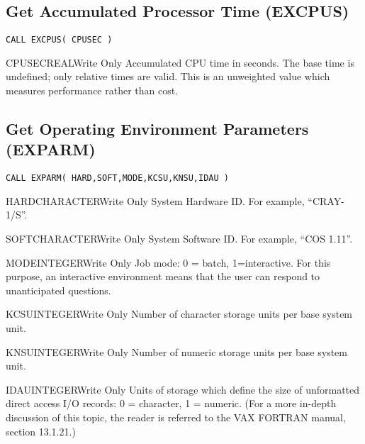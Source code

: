 \subsection{Get Accumulated Processor Time (EXCPUS)}

\verb+CALL EXCPUS( CPUSEC )+

\begin{argy}{CPUSEC}{REAL}{Write Only}
Accumulated CPU time in seconds.  The base time is undefined; only relative
times are valid.  This is an unweighted value which measures performance
rather than cost. 
\end{argy}

\subsection{Get Operating Environment Parameters (EXPARM)}

\verb+CALL EXPARM( HARD,SOFT,MODE,KCSU,KNSU,IDAU )+

\begin{argy}{HARD}{CHARACTER}{Write Only}
System Hardware ID.  For example, ``CRAY-1/S''.
\end{argy}

\begin{argy}{SOFT}{CHARACTER}{Write Only}
System Software ID.  For example, ``COS 1.11''.
\end{argy}

\begin{argy}{MODE}{INTEGER}{Write Only}
Job mode: 0 = batch, 1=interactive.  For this purpose, an interactive
environment means that the user can respond to unanticipated questions. 
\end{argy}

\begin{argy}{KCSU}{INTEGER}{Write Only}
Number of character storage units per base system unit.
\end{argy}

\begin{argy}{KNSU}{INTEGER}{Write Only}
Number of numeric storage units per base system unit.
\end{argy}

\begin{argy}{IDAU}{INTEGER}{Write Only}
Units of storage which define the size of unformatted direct access I/O
records: 0 = character, 1 = numeric.
(For a more in-depth discussion of this topic, the reader is
referred to the VAX FORTRAN manual,
section 13.1.21.)
\end{argy}

